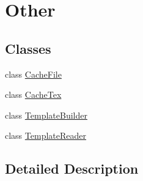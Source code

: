 \hypertarget{group__gr___other}{}\section{Other}
\label{group__gr___other}
\subsection*{Classes}
\begin{DoxyCompactItemize}
\item 
class \hyperlink{class_cache_file}{Cache\+File}
\item 
class \hyperlink{class_cache_tex}{Cache\+Tex}
\item 
class \hyperlink{class_template_builder}{Template\+Builder}
\item 
class \hyperlink{class_template_reader}{Template\+Reader}
\end{DoxyCompactItemize}


\subsection{Detailed Description}
